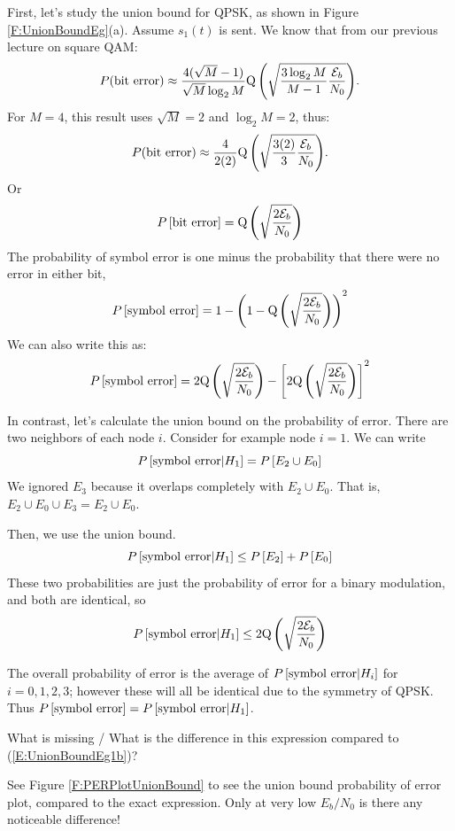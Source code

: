   First, let's study the union bound for QPSK, as
shown in Figure \ref{F:UnionBoundEg}(a).  Assume $s_1(t)$ is sent.
We know that from our previous lecture on square QAM:
\begin{equation} 
  P(\mbox{bit error}) \approx \frac{4(\sqrt{M}-1)}{\sqrt{M} \log_2 M} {\mbox{Q}\left( {\sqrt{\frac{3 \log_2 M}{M-1} \frac{\mathcal{E}_b}{N_0}}} \right)}.
\end{equation}
For $M=4$, this result uses $\sqrt{M}=2$ and $\log_2 M = 2$, thus:
\begin{equation} \label{E:PrSymbolErrorMPAM_review}
  P(\mbox{bit error}) \approx \frac{4}{2 (2)} {\mbox{Q}\left( {\sqrt{\frac{3 (2)}{3} \frac{\mathcal{E}_b}{N_0}}} \right)}.
\end{equation}
Or
\[
  P\left[{\mbox{bit error}}\right] = {\mbox{Q}\left( {\sqrt{\frac{2 \mathcal{E}_b}{ N_0}}} \right)}
\]
The probability of symbol error is one minus the probability that there were no error in either bit,
\begin{equation}\label{E:UnionBoundEg1a}
  P\left[{\mbox{symbol error}}\right] = 1-\left(1-{\mbox{Q}\left( {\sqrt{\frac{2 \mathcal{E}_b}{ N_0}}} \right)}\right)^2
\end{equation}
We can also write this as:
\begin{equation}\label{E:UnionBoundEg1b}
  P\left[{\mbox{symbol error}}\right] = 2{\mbox{Q}\left( {\sqrt{\frac{2 \mathcal{E}_b}{ N_0}}} \right)} - \left[ 2{\mbox{Q}\left( {\sqrt{\frac{2 \mathcal{E}_b}{ N_0}}} \right)}\right]^2
\end{equation}

In contrast, let's calculate the union bound on the probability of
error. There are two neighbors of each node $i$.  Consider for example node $i=1$.  We can write
\[
  P\left[{\mbox{symbol error} | H_1}\right] = P\left[{E_2 \cup E_0}\right]
\]
We ignored $E_3$ because it overlaps completely with $E_2 \cup E_0$.
That is, $E_2 \cup E_0 \cup E_3 = E_2 \cup E_0$.

Then, we use the union bound.
\[
  P\left[{\mbox{symbol error} | H_1}\right] \le  P\left[{E_2}\right] + P\left[{E_0}\right]
\]
These two probabilities are just the probability of error for a
binary modulation, and both are identical, so
\[
  P\left[{\mbox{symbol error} | H_1}\right] \le  2 {\mbox{Q}\left( {\sqrt{\frac{2 \mathcal{E}_b}{ N_0}}} \right)}
\]

The overall probability of error is the average of $P\left[{\mbox{symbol error} | H_i}\right]$ for $i=0,1,2,3$; however these will all be identical due to the symmetry of QPSK.  Thus $P\left[{\mbox{symbol error} }\right] = P\left[{\mbox{symbol error} | H_1}\right]$.


What is missing / What is the difference in this expression compared
to (\ref{E:UnionBoundEg1b})?

See Figure \ref{F:PERPlotUnionBound} to see the union bound
probability of error plot, compared to the exact expression.  Only
at very low $E_b/N_0$ is there any noticeable difference!

